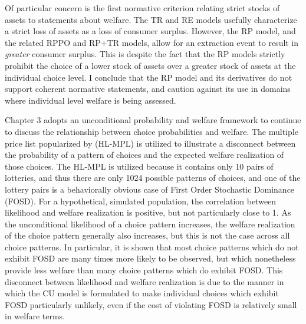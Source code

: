 \documentclass[../main.tex]{subfiles}
\begin{document}
Of particular concern is the first normative criterion relating strict stocks of assets to statements about welfare.
The TR and RE models usefully characterize a strict loss of assets as a loss of consumer surplus.
However, the RP model, and the related RPPO and RP+TR models, allow for an extraction event to result in \textit{greater} consumer surplus.
This is despite the fact that the RP models strictly prohibit the choice of a lower stock of assets over a greater stock of assets at the individual choice level.
I conclude that the RP model and its derivatives do not support coherent normative statements, and caution against its use in domains where individual level welfare is being assessed.

Chapter 3 adopts an unconditional probability and welfare framework to continue to discuss the relationship between choice probabilities and welfare.
The multiple price list popularized by \textcite{Holt2002} (HL-MPL) is utilized to illustrate a disconnect between the probability of a pattern of choices and the expected welfare realization of those choices.
The HL-MPL is utilized because it contains only 10 pairs of lotteries, and thus there are only 1024 possible patterns of choices, and one of the lottery pairs is a behaviorally obvious case of First Order Stochastic Dominance (FOSD).
For a hypothetical, simulated population, the correlation between likelihood and welfare realization is positive, but not particularly close to 1.
As the unconditional likelihood of a choice pattern increases, the welfare realization of the choice pattern generally also increases, but this is not the case across all choice patterns.
In particular, it is shown that most choice patterns which do not exhibit FOSD are many times more likely to be observed, but which nonetheless provide less welfare than many choice patterns which do exhibit FOSD.
This disconnect between likelihood and welfare realization is due to the manner in which the CU model is formulated to make individual choices which exhibit FOSD particularly unlikely, even if the cost of violating FOSD is relatively small in welfare terms.

\end{document}
